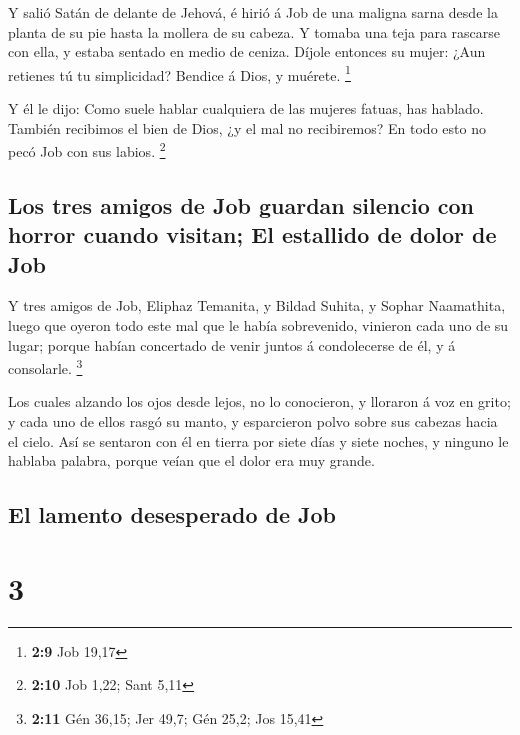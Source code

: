  Y salió Satán de delante de Jehová, é hirió á Job de una
maligna sarna desde la planta de su pie hasta la mollera de su cabeza.
 Y tomaba una teja para rascarse con ella, y estaba sentado
en medio de ceniza.  Díjole entonces su mujer: ¿Aun retienes
tú tu simplicidad? Bendice á Dios, y muérete. \footnote{\textbf{2:9} Job
  19,17}

 Y él le dijo: Como suele hablar cualquiera de las mujeres
fatuas, has hablado. También recibimos el bien de Dios, ¿y el mal no
recibiremos? En todo esto no pecó Job con sus labios. \footnote{\textbf{2:10}
  Job 1,22; Sant 5,11}

\hypertarget{los-tres-amigos-de-job-guardan-silencio-con-horror-cuando-visitan-el-estallido-de-dolor-de-job}{%
\subsection{Los tres amigos de Job guardan silencio con horror cuando
visitan; El estallido de dolor de
Job}\label{los-tres-amigos-de-job-guardan-silencio-con-horror-cuando-visitan-el-estallido-de-dolor-de-job}}

 Y tres amigos de Job, Eliphaz Temanita, y Bildad Suhita, y
Sophar Naamathita, luego que oyeron todo este mal que le había
sobrevenido, vinieron cada uno de su lugar; porque habían concertado de
venir juntos á condolecerse de él, y á consolarle. \footnote{\textbf{2:11}
  Gén 36,15; Jer 49,7; Gén 25,2; Jos 15,41}

 Los cuales alzando los ojos desde lejos, no lo conocieron,
y lloraron á voz en grito; y cada uno de ellos rasgó su manto, y
esparcieron polvo sobre sus cabezas hacia el cielo.  Así se
sentaron con él en tierra por siete días y siete noches, y ninguno le
hablaba palabra, porque veían que el dolor era muy grande.

\hypertarget{el-lamento-desesperado-de-job}{%
\subsection{El lamento desesperado de
Job}\label{el-lamento-desesperado-de-job}}

\hypertarget{section-2}{%
\section{3}\label{section-2}}

